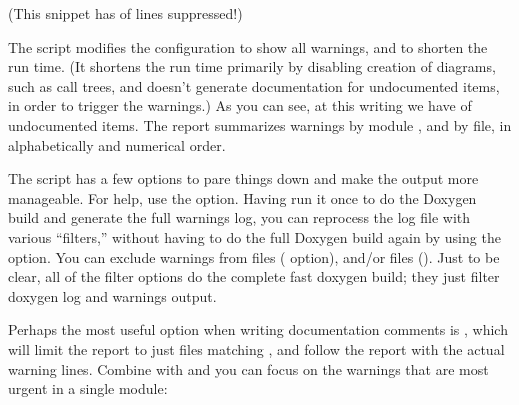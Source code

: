 \documentclass[letterpaper,10pt,english]{sphinxmanual}
\renewcommand{\sphinxcode}[1]{\texttt{\small{#1}}}
\begin{document}
(This snippet has  of lines suppressed!)

The script modifies the configuration to show all warnings, and to
shorten the run time.  (It shortens the run time primarily by
disabling creation of diagrams, such as call trees, and doesn’t
generate documentation for undocumented items, in order to trigger the
warnings.)  As you can see, at this writing we have  of
undocumented items.  The report summarizes warnings by module
\sphinxcode{}, and by file, in alphabetically and numerical order.

The script has a few options to pare things down and make the output more
manageable.  For help, use the \sphinxcode{} option.  Having run it once
to do the Doxygen build and generate the full warnings log,
you can reprocess the log file with various “filters,”
without having to do the full Doxygen build again by
using the \sphinxcode{} option.  You can exclude warnings
from \sphinxcode{} files (\sphinxcode{} option), and/or \sphinxcode{} files
(\sphinxcode{}).  Just to be clear, all of the filter options do the complete
fast doxygen build; they just filter doxygen log and warnings output.

Perhaps the most useful option when writing documentation comments
is \sphinxcode{\sphinxupquote{\sphinxhyphen{}m \textless{}module\textgreater{}}}, which will limit the report to just files matching
\sphinxcode{\sphinxupquote{src/\textless{}module\textgreater{}/*}}, and follow the report with the actual warning lines.
Combine with \sphinxcode{} and you can focus on the warnings that are most
urgent in a single module:
\end{document}

